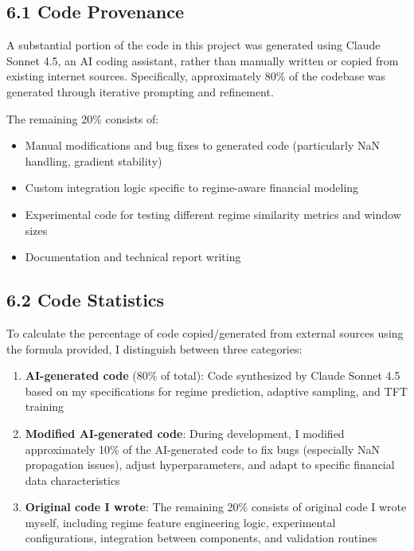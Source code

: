 \documentclass[
]{article}
\begin{document}
\subsection{6.1 Code Provenance}\label{61-code-provenance}

A substantial portion of the code in this project was generated using
Claude Sonnet 4.5, an AI coding assistant, rather than manually written
or copied from existing internet sources. Specifically, approximately
80\% of the codebase was generated through iterative prompting and
refinement.

The remaining 20\% consists of:

\begin{itemize}
\item
  Manual modifications and bug fixes to generated code (particularly NaN
  handling, gradient stability)
\item
  Custom integration logic specific to regime-aware financial modeling
\item
  Experimental code for testing different regime similarity metrics and
  window sizes
\item
  Documentation and technical report writing
\end{itemize}

\subsection{6.2 Code Statistics}\label{62-code-statistics}

To calculate the percentage of code copied/generated from external
sources using the formula provided, I distinguish between three
categories:

\begin{enumerate}
\def\labelenumi{\arabic{enumi}.}
\item
  \textbf{AI-generated code} (80\% of total): Code synthesized by Claude
  Sonnet 4.5 based on my specifications for regime prediction, adaptive
  sampling, and TFT training
\item
  \textbf{Modified AI-generated code}: During development, I modified
  approximately 10\% of the AI-generated code to fix bugs (especially
  NaN propagation issues), adjust hyperparameters, and adapt to specific
  financial data characteristics
\item
  \textbf{Original code I wrote}: The remaining 20\% consists of
  original code I wrote myself, including regime feature engineering
  logic, experimental configurations, integration between components,
  and validation routines
\end{enumerate}
\end{document}
